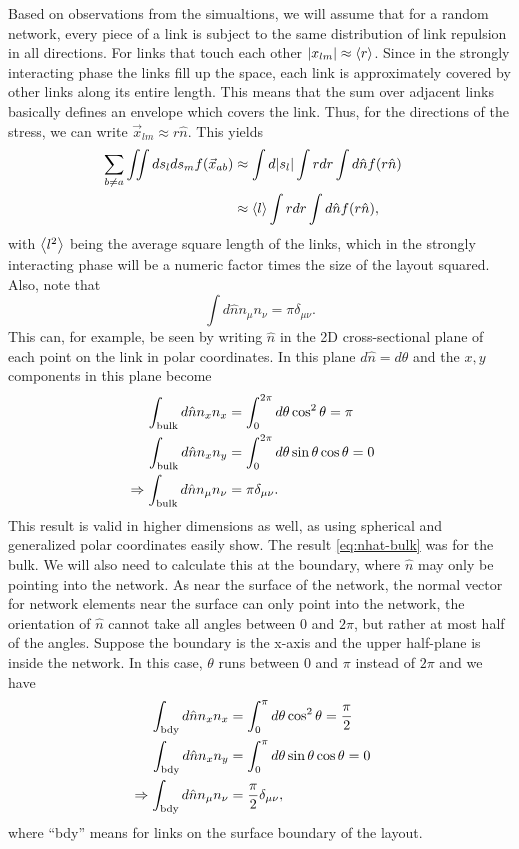 \documentclass[linenumbers,endfloats,nofootinbib,preprint,floatfix,titlepage,superscriptaddress]{revtex4-1} %
\begin{document}
Based on observations from the simualtions, we will assume that for a random network, every piece of a link is subject to the same distribution of link repulsion in all directions. 
For links that touch each other $|x_{lm}| \approx \left<r\right>$. 
Since in the strongly interacting phase the links fill up the space, each link is approximately covered by other links along its entire length. This means that the sum over adjacent links basically defines an envelope which covers the link.
Thus, for the directions of the stress,  we can write $\vec{x}_{lm} \approx  r\hat{n}$. 
This yields 
\begin{align}
    \sum_{b\ne a} \iint ds_lds_m f(\vec{x}_{ab}) &  \approx \int d|s_l| \int r dr \int d\hat{n} f(r\hat{n})\cr 
    & \approx  \left<l\right>\int rdr\int d\hat{n} f(r\hat{n}),
    \label{eq:apr-int}
\end{align}
with $\left<l^2\right>$ being the average square length of the links, which in the strongly interacting phase will be a numeric factor times the size of the layout squared. 
Also, note that 
\begin{equation}
\int d\hat{n} n_\mu n_\nu =\pi \delta_{\mu\nu}. 
\end{equation}
This can, for example, be seen by writing $\hat{n}$ in the 2D cross-sectional plane of each point on the link in polar coordinates. 
In this plane $d\hat{n} = d\theta $ and  the $x,y$ components in this plane become
\begin{align}
    \int_\mathrm{bulk} d\hat{n} n_x n_x & = 
    \int_0^{2\pi} d\theta \cos^2 \theta = \pi \cr
    \int_\mathrm{bulk} d\hat{n} n_x n_y & = \int_0^{2\pi} d\theta \sin \theta \cos \theta = 0 \cr 
    \Rightarrow  \int_\mathrm{bulk} d\hat{n} n_\mu n_\nu & = \pi \delta_{\mu\nu}.
    \label{eq:nhat-bulk}
\end{align}
This result is valid in higher dimensions as well, as using spherical and generalized polar coordinates easily show. 
The result \eqref{eq:nhat-bulk} was for the bulk.
We will also need to calculate this at the boundary, where $\hat{n} $ may only be pointing into the network. 
As near the surface of the network, the normal vector for network elements near the surface can only point into the network, the orientation of $\hat{n}$ cannot take all angles between 0 and $2\pi$, but rather at most half of the angles. 
Suppose the boundary is the x-axis and the upper half-plane is inside the network.
In this case, $\theta$ runs between $0$ and $\pi$ instead of $2\pi$ and we have 
\begin{align}
    \int_\mathrm{bdy} d\hat{n} n_x n_x & = 
    \int_0^\pi d\theta \cos^2 \theta = {\pi\over 2}  \cr
    \int_\mathrm{bdy} d\hat{n} n_x n_y & = \int_0^\pi d\theta \sin \theta \cos \theta = 0 \cr 
    \Rightarrow  \int_\mathrm{bdy} d\hat{n} n_\mu n_\nu & = {\pi\over 2} \delta_{\mu\nu}, 
    \label{eq:nhat-bdy}
\end{align}
where ``bdy'' means for links on the surface boundary of the layout. 
\end{document}
